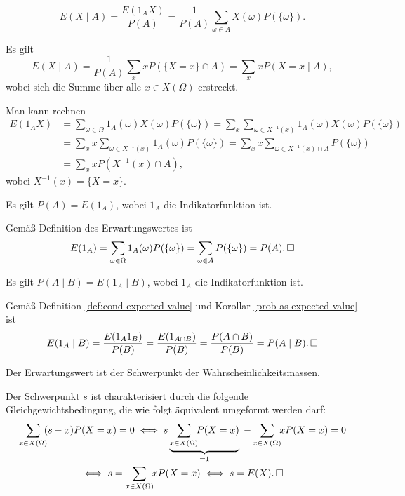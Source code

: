 \begin{Definition}%
%
\label{def:cond-expected-value}\newlinefirst
\[E(X\mid A) = \frac{E(1_A X)}{P(A)} = \frac{1}{P(A)}\sum_{\omega\in A} X(\omega)P(\{\omega\}).\]
\end{Definition}

\begin{Satz} Es gilt
\[E(X\mid A) = \frac{1}{P(A)}\sum_x xP(\{X=x\}\cap A)
= \sum_x xP(X=x\mid A),\]
wobei sich die Summe über alle $x\in X(\Omega)$ erstreckt.
\end{Satz}
 Man kann rechnen
\begin{align*}
E(1_A X) &= \sum_{\omega\in\Omega} 1_A(\omega) X(\omega) P(\{\omega\})
= \sum_x\sum_{\omega\in X^{-1}(x)} 1_A(\omega) X(\omega) P(\{\omega\})\\
&= \sum_x x\sum_{\omega\in X^{-1}(x)} 1_A(\omega) P(\{\omega\})
= \sum_x x\sum_{\omega\in X^{-1}(x)\cap A} P(\{\omega\})\\
&= \sum_x x P(X^{-1}(x)\cap A),
\end{align*}
wobei $X^{-1}(x) = \{X=x\}$.\;\qedsymbol

\begin{Korollar}\label{prob-as-expected-value}
Es gilt $P(A) = E(1_A)$, wobei $1_A$ die Indikatorfunktion ist.
\end{Korollar}
\begin{Beweis}
Gemäß Definition des Erwartungswertes ist
\[E(1_A) = \sum_{\omega\in\Omega} 1_A(\omega)P(\{\omega\})
= \sum_{\omega\in A}P(\{\omega\}) = P(A).\,\square\]
\end{Beweis}

\begin{Korollar}
Es gilt $P(A\mid B) = E(1_A\mid B)$, wobei $1_A$ die Indikatorfunktion ist.
\end{Korollar}
\begin{Beweis}
Gemäß Definition \ref{def:cond-expected-value}
und Korollar \ref{prob-as-expected-value} ist
\[E(1_A\mid B) = \frac{E(1_A 1_B)}{P(B)} = \frac{E(1_{A\cap B})}{P(B)}
= \frac{P(A\cap B)}{P(B)} = P(A\mid B).\,\square\]
\end{Beweis}

\begin{Korollar}
Der Erwartungswert ist der Schwerpunkt der Wahrscheinlichkeitsmassen.
\end{Korollar}
\begin{Beweis} Der Schwerpunkt $s$ ist charakterisiert durch die folgende
Gleichgewichtsbedingung, die wie folgt äquivalent umgeformt werden
darf:
\begin{gather*}
\sum_{x\in X(\Omega)}\!\! (s-x)P(X=x) = 0
\iff s\underbrace{\sum_{x\in X(\Omega)}\!\! P(X=x)}_{=1}\;
- \sum_{x\in X(\Omega)}\!\! xP(X=x) = 0\\
\iff s = \sum_{x\in X(\Omega)}\!\! xP(X=x) \iff s = E(X).\,\qedsymbol
\end{gather*}
\end{Beweis}

